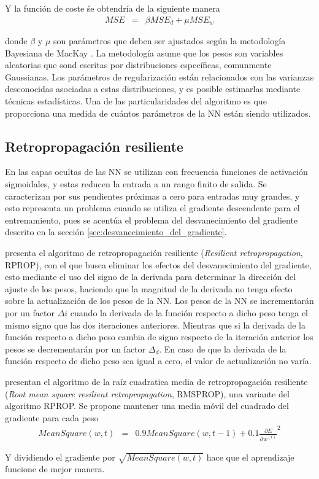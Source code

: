 Y la función de coste śe obtendría de la siguiente manera
\begin{eqnarray}
	MSE &=& \beta MSE_{d} + \mu MSE_{w}
\end{eqnarray}

donde $\beta$ y $\mu$ son parámetros que deben ser ajustados según la metodología Bayesiana de MacKay \cite{MacKay1992a, MacKay1992b}. La metodología asume que los pesos son variables aleatorias que sond escritas por distribuciones específicas, comunmente Gaussianas. Los parámetros de regularización están relacionados con las varianzas desconocidas asociadas a estas distribuciones, y es posible estimarlas mediante técnicas estadísticas. Una de las particularidades del algoritmo es que proporciona una medida de cuántos parámetros de la NN están siendo utilizados.

\subsection{Retropropagación resiliente}
En las capas ocultas de las NN se utilizan con frecuencia funciones de activación sigmoidales, y estas reducen la entrada a un rango finito de salida. Se caracterizan por sus pendientes próximas a cero para entradas muy grandes, y esto representa un problema cuando se utiliza el gradiente descendente para el entrenamiento, pues se acentúa el problema del desvanecimiento del gradiente descrito en la sección \ref{sec:desvanecimiento_del_gradiente}.

 presenta el algoritmo de retropropagación resiliente ({\em Resilient retropropagation}, RPROP), con el que busca eliminar los efectos del desvanecimiento del gradiente, esto mediante el uso del signo de la derivada para determinar la dirección del ajuste de los pesos, haciendo que la magnitud de la derivada no tenga efecto sobre la actualización de los pesos de la NN. Los pesos de la NN se incrementarán por un factor $\Delta{i}$ cuando la derivada de la función respecto a dicho peso tenga el mismo signo que las dos iteraciones anteriores. Mientras que si la derivada de la función respecto a dicho peso cambia de signo respecto de la iteración anterior los pesos se decrementarán por un factor $\Delta_{d}$. En caso de que la derivada de la función respecto de dicho peso sea igual a cero, el valor de actualización no varía.

 presentan el algoritmo de la raíz cuadratica media de retropropagación resiliente ({\em Root mean square resilient retropropagation}, RMSPROP), una variante  del algoritmo RPROP. Se propone mantener una media móvil del cuadrado del gradiente para cada peso
\begin{eqnarray}
	MeanSquare(w, t) &=& 0.9MeanSquare(w, t - 1) + 0.1\frac{\partial E}{\partial w^{(t)}}^{2}
\end{eqnarray}

Y dividiendo el gradiente por $\sqrt{MeanSquare(w, t)}$ hace que el aprendizaje funcione de mejor manera.

